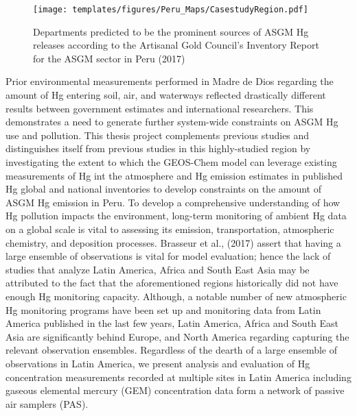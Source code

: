 \begin{flushleft}
\begin{figure}[H]
  \texttt{[image: templates/figures/Peru\_Maps/CasestudyRegion.pdf]}
  \centering
  \caption{Departments predicted to be the prominent sources of ASGM Hg releases according to the Artisanal Gold Council's  Inventory Report for the ASGM sector in Peru (2017) }
  \label{fig:PeruCS}
\end{figure}
\FloatBarrier

Prior environmental measurements performed in Madre de Dios regarding the amount of Hg entering soil, air, and waterways reflected drastically different results between government estimates and international researchers. This demonstrates a need to generate further system-wide constraints on ASGM Hg use and pollution. This thesis project complements previous studies and distinguishes itself from previous studies in this highly-studied region by investigating the extent to which the GEOS-Chem model can leverage existing measurements of Hg int the atmosphere and Hg emission estimates in published Hg global and national inventories to develop constraints on the amount of ASGM Hg emission in Peru. To develop a comprehensive understanding of how Hg pollution impacts the environment, long-term monitoring of ambient Hg data on a global scale is vital to assessing its emission, transportation, atmospheric chemistry, and deposition processes. Brasseur et al., (2017) assert that having a large ensemble of observations is vital for model evaluation; hence the lack of studies that analyze Latin America, Africa and South East Asia may be attributed to the fact that the aforementioned regions historically did not have enough Hg monitoring capacity. Although, a notable number of new atmospheric Hg monitoring programs have been set up and monitoring data from Latin America published in the last few years, Latin America, Africa and South East Asia are significantly behind Europe, and North America regarding capturing the relevant observation ensembles. Regardless of the dearth of a large ensemble  of observations in Latin America, we present analysis and evaluation of Hg  concentration measurements recorded at multiple sites in Latin America including gaseous elemental mercury (GEM) concentration data form a network of passive air samplers (PAS). 
\end{flushleft}



